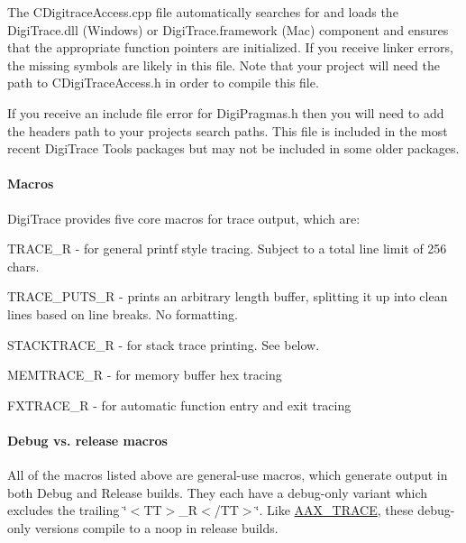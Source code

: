 \begin{DoxyItemize}
\item The C\+Digitrace\+Access.\+cpp file automatically searches for and loads the Digi\+Trace.\+dll (Windows) or Digi\+Trace.\+framework (Mac) component and ensures that the appropriate function pointers are initialized. If you receive linker errors, the missing symbols are likely in this file. Note that your project will need the path to C\+Digi\+Trace\+Access.\+h in order to compile this file.
\item If you receive an include file error for Digi\+Pragmas.\+h then you will need to add the header\textquotesingle{}s path to your project\textquotesingle{}s search paths. This file is included in the most recent Digi\+Trace Tools packages but may not be included in some older packages.
\end{DoxyItemize}

\hypertarget{a00834_digitrace__advancedlogging__macros}{}\paragraph{Macros}\label{a00834_digitrace__advancedlogging__macros}
 Digi\+Trace provides five core macros for trace output, which are\+:


\begin{DoxyItemize}
\item {\ttfamily T\+R\+A\+C\+E\+\_\+R } -\/ for general printf style tracing. Subject to a total line limit of 256 chars.
\item {\ttfamily T\+R\+A\+C\+E\+\_\+\+P\+U\+T\+S\+\_\+R } -\/ prints an arbitrary length buffer, splitting it up into clean lines based on line breaks. No formatting.
\item {\ttfamily S\+T\+A\+C\+K\+T\+R\+A\+C\+E\+\_\+R } -\/ for stack trace printing. See below.
\item {\ttfamily M\+E\+M\+T\+R\+A\+C\+E\+\_\+R } -\/ for memory buffer hex tracing
\item {\ttfamily F\+X\+T\+R\+A\+C\+E\+\_\+R } -\/ for automatic function entry and exit tracing
\end{DoxyItemize}

\hypertarget{a00834_digitrace__advancedlogging__macros__debugvsrelease}{}\paragraph{Debug vs. release macros}\label{a00834_digitrace__advancedlogging__macros__debugvsrelease}
 All of the macros listed above are general-\/use macros, which generate output in both Debug and Release builds. They each have a debug-\/only variant which excludes the trailing \char`\"{}$<$\+T\+T$>$\+\_\+\+R$<$/\+T\+T$>$\char`\"{}. Like \mbox{\hyperlink{a00395_ab53f1d6a94f8b6ebb3a101f71bfe4e82}{A\+A\+X\+\_\+\+T\+R\+A\+CE}}, these debug-\/only versions compile to a noop in release builds.

